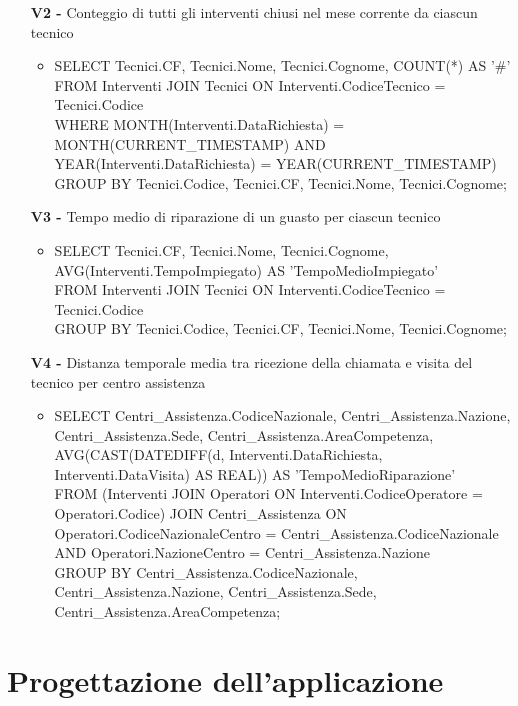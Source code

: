 \documentclass[a4paper, 12pt]{report}
\begin{document}
\begin{itemize}
\begin{itemize}[leftmargin=*, topsep=0pt]
		\end{itemize}
	\item[\textbf{V2 -}] Conteggio di tutti gli interventi chiusi nel mese corrente da ciascun tecnico
		\begin{itemize}[leftmargin=*, topsep=0pt]
			\item SELECT Tecnici.CF, Tecnici.Nome, Tecnici.Cognome, COUNT(*) AS '\#'\\
			FROM Interventi JOIN Tecnici ON Interventi.CodiceTecnico = Tecnici.Codice\\
			WHERE MONTH(Interventi.DataRichiesta) = MONTH(CURRENT\_TIMESTAMP) AND YEAR(Interventi.DataRichiesta) = YEAR(CURRENT\_TIMESTAMP)\\
			GROUP BY Tecnici.Codice, Tecnici.CF, Tecnici.Nome, Tecnici.Cognome;
		\end{itemize}
	\item[\textbf{V3 -}] Tempo medio di riparazione di un guasto per ciascun tecnico
		\begin{itemize}[leftmargin=*, topsep=0pt]
			\item SELECT Tecnici.CF, Tecnici.Nome, Tecnici.Cognome, AVG(Interventi.TempoImpiegato) AS 'TempoMedioImpiegato'\\
			FROM Interventi JOIN Tecnici ON Interventi.CodiceTecnico = Tecnici.Codice\\
			GROUP BY Tecnici.Codice, Tecnici.CF, Tecnici.Nome, Tecnici.Cognome;
		\end{itemize}
	\newpage
	\item[\textbf{V4 -}] Distanza temporale media tra ricezione della chiamata e visita del tecnico per centro assistenza
		\begin{itemize}[leftmargin=*, topsep=0pt]
			\item SELECT Centri\_Assistenza.CodiceNazionale, Centri\_Assistenza.Nazione, Centri\_Assistenza.Sede, Centri\_Assistenza.AreaCompetenza, AVG(CAST(DATEDIFF(d, Interventi.DataRichiesta, Interventi.DataVisita) AS REAL)) AS 'TempoMedioRiparazione'\\
			FROM (Interventi JOIN Operatori ON Interventi.CodiceOperatore = Operatori.Codice) JOIN Centri\_Assistenza ON Operatori.CodiceNazionaleCentro = Centri\_Assistenza.CodiceNazionale AND Operatori.NazioneCentro = Centri\_Assistenza.Nazione\\
			GROUP BY Centri\_Assistenza.CodiceNazionale, Centri\_Assistenza.Nazione, Centri\_Assistenza.Sede, Centri\_Assistenza.AreaCompetenza;
		\end{itemize}
\end{itemize}

\chapter{Progettazione dell'applicazione}
\end{document}
